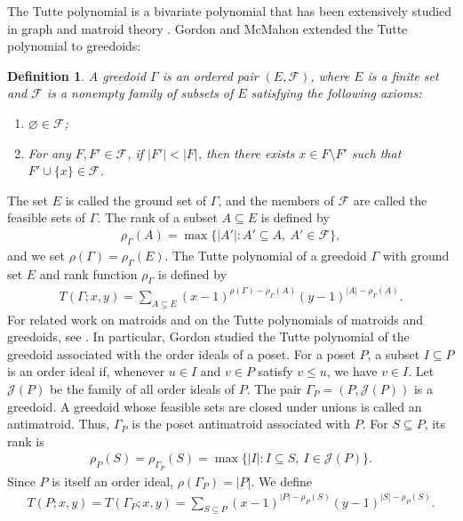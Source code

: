 \documentclass[10pt,a4paper]{amsart}
\newtheorem{definition}{Definition}[section]
\begin{document}
The Tutte polynomial is a bivariate polynomial that has been extensively studied in graph and matroid theory
\cite{BauerEtAl2026, BrylawskiOxley1992, ChaudharyGordon1991, ColbournProvanVertigan1995}.
Gordon and McMahon \cite{GordonMcMahon1989} extended the Tutte polynomial to greedoids:

\begin{definition}\label{def:greedoid}
A greedoid $\Gamma$ is an ordered pair $(E,\mathcal F)$, where $E$ is a finite set 
and $\mathcal F$ is a nonempty family of subsets of $E$ satisfying the following axioms:
\begin{enumerate}
 \item[\textup{(i)}] $\varnothing\in\mathcal F$;
 \item[\textup{(ii)}] For any $F,F'\in\mathcal F$, if $|F'|<|F|$, 
 then there exists $x\in F\setminus F'$ such that $F'\cup\{x\}\in\mathcal F$.
\end{enumerate}
\end{definition}

The set $E$ is called the ground set of $\Gamma$, and the members of
$\mathcal F$ are called the feasible sets of $\Gamma$.
The rank of a subset $A\subseteq E$ is defined by
\begin{eqnarray*}
\rho_{\Gamma}(A)=\max\{|A'|:A'\subseteq A,\ A'\in\mathcal F\},
\end{eqnarray*}
and we set $\rho(\Gamma)=\rho_{\Gamma}(E)$.
The Tutte polynomial of a greedoid $\Gamma$ with ground set $E$
and rank function $\rho_\Gamma$ is defined by
\begin{eqnarray*}
T(\Gamma;x,y)
= \sum_{A\subseteq E}
(x-1)^{\rho(\Gamma)-\rho_\Gamma(A)}
(y-1)^{|A|-\rho_\Gamma(A)}.
\end{eqnarray*}
For related work on matroids and on the Tutte polynomials of matroids and greedoids, see
\cite{Bjorner1985, GeelenZhou2006, GordonMcMahon2022, KnappNoble2025, LuoWuLai2026, McMahon1993, Zhou2004, Zhou2018}.
In particular, Gordon \cite{Gordon1993} studied the Tutte polynomial of the greedoid
associated with the order ideals of a poset.
For a poset $P$, a subset $I\subseteq P$ is an order ideal if,
whenever $u\in I$ and $v\in P$ satisfy $v\leq u$, we have $v\in I$.
Let $\mathcal J(P)$ be the family of all order ideals of $P$.
The pair $\Gamma_P=(P,\mathcal J(P))$ is a greedoid.
A greedoid whose feasible sets are closed under unions is
called an antimatroid. Thus, $\Gamma_P$ is the poset antimatroid associated with $P$. 
For $S\subseteq P$, its rank is
\begin{eqnarray*}
\rho_P(S)=\rho_{\Gamma_P}(S)=\max\{|I|:I\subseteq S,\ I\in\mathcal J(P)\}.
\end{eqnarray*}
Since $P$ is itself an order ideal, $\rho(\Gamma_P)=|P|$. We define
\begin{eqnarray*}
T(P;x,y)=T(\Gamma_P;x,y)=\sum_{S\subseteq P}(x-1)^{|P|-\rho_P(S)}(y-1)^{|S|-\rho_P(S)}.
\end{eqnarray*}
\end{document}
